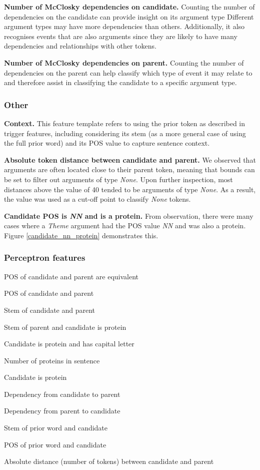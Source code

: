 \documentclass{article} %
\begin{document}
\textbf{Number of McClosky dependencies on candidate.} Counting the number of dependencies on the candidate can provide insight on its argument type Different argument types may have more dependencies than others. Additionally, it also recognises events that are also arguments since they are likely to have many dependencies and relationships with other tokens.

\textbf{Number of McClosky dependencies on parent.} Counting the number of dependencies on the parent can help classify which type of event it may relate to and therefore assist in classifying the candidate to a specific argument type.

\subsubsection{Other}

\textbf{Context.} This feature template refers to using the prior token as described in trigger features, including considering its stem (as a more general case of using the full prior word) and its POS value to capture sentence context.

\textbf{Absolute token distance between candidate and parent.} \cite{2} We observed that arguments are often located close to their parent token, meaning that bounds can be set to filter out arguments of type \emph{None}. Upon further inspection, most distances above the value of 40 tended to be arguments of type \emph{None}. As a result, the value was used as a cut-off point to classify \emph{None} tokens.

\textbf{Candidate POS is \emph{NN} and is a protein.} From observation, there were many cases where a \emph{Theme} argument had the POS value \emph{NN} and was also a protein. Figure \ref{candidate_nn_protein} demonstrates this.

\subsubsection{Perceptron features}

\begin{itemize*}

\item POS of candidate and parent are equivalent
\item POS of candidate and parent
\item Stem of candidate and parent
\item Stem of parent and candidate is protein
\item Candidate is protein and has capital letter
\item Number of proteins in sentence
\item Candidate is protein
\item Dependency from candidate to parent
\item Dependency from parent to candidate
\item Stem of prior word and candidate
\item POS of prior word and candidate
\item Absolute distance (number of tokens) between candidate and parent

\end{itemize*}
\end{document}
